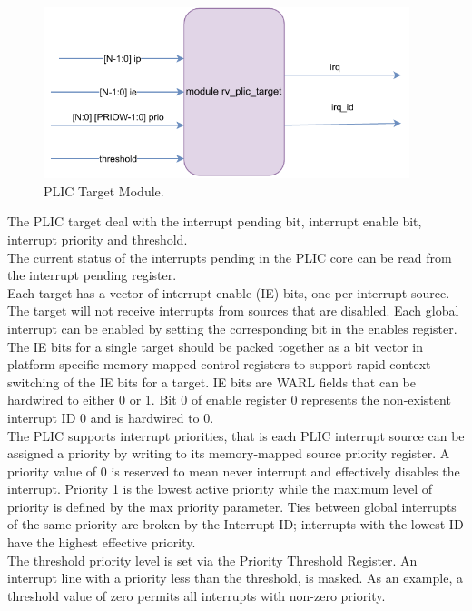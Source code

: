 \begin{figure}[h]
  \centering
  \includegraphics[width=0.95\textwidth]{./fatima_figures/target.drawio.pdf}
  \caption{PLIC Target Module.}
  \label{fig:plic_target}
\end{figure}

The PLIC target deal with the interrupt pending bit, interrupt enable bit, interrupt priority and threshold.\\

The current status of the interrupts pending in the PLIC core can be read from the interrupt pending register. \\

Each target has a vector of interrupt enable (IE) bits, one per interrupt source. The target will not receive interrupts from sources that are disabled. Each global interrupt can be enabled by setting the corresponding bit in the enables register. The IE bits for a single target should be packed together as a bit vector in platform-specific memory-mapped control registers to support rapid context switching of the IE bits for a target. IE bits are WARL fields that can be hardwired to either 0 or 1. Bit 0 of enable register 0 represents the non-existent interrupt ID 0 and is hardwired to 0. \\

The PLIC supports interrupt priorities, that is each PLIC interrupt source can be assigned a priority by writing to its memory-mapped source priority register. A priority value of 0 is reserved to mean never interrupt and effectively disables the interrupt. Priority 1 is the lowest active priority while the maximum level of priority is defined by the max priority parameter. Ties between global interrupts of the same priority are broken by the Interrupt ID; interrupts with the lowest ID have the highest effective priority.\\

The threshold priority level is set via the Priority Threshold Register. An interrupt line with a priority less than the threshold, is masked. As an example, a threshold value of zero permits all interrupts with non-zero priority.\\

